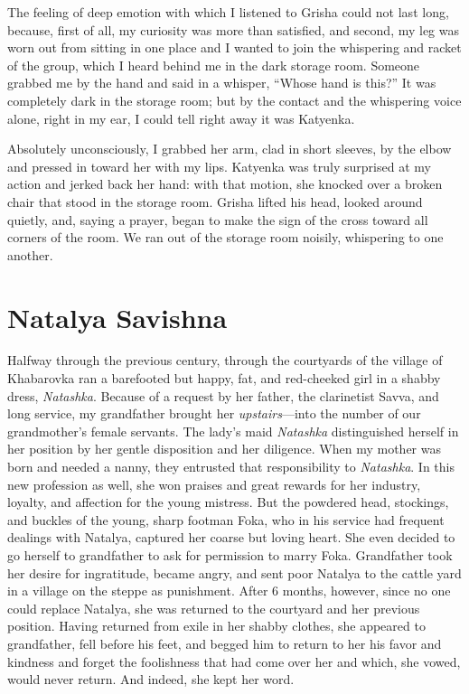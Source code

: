 The feeling of deep emotion with which I listened to Grisha could not last long, because, first of all, my curiosity was more than satisfied, and second, my leg was worn out from sitting in one place and I wanted to join the whispering and racket of the group, which I heard behind me in the dark storage room. Someone grabbed me by the hand and said in a whisper, ``Whose hand is this?'' It was completely dark in the storage room; but by the contact and the whispering voice alone, right in my ear, I could tell right away it was Katyenka.

Absolutely unconsciously, I grabbed her arm, clad in short sleeves, by the elbow and pressed in toward her with my lips. Katyenka was truly surprised at my action and jerked back her hand: with that motion, she knocked over a broken chair that stood in the storage room. Grisha lifted his head, looked around quietly, and, saying a prayer, began to make the sign of the cross toward all corners of the room. We ran out of the storage room noisily, whispering to one another.

\chapter{Natalya Savishna}

Halfway through the previous century, through the courtyards of the village of Khabarovka ran a barefooted but happy, fat, and red-cheeked girl in a shabby dress, \textit{Natashka}. Because of a request by her father, the clarinetist Savva, and long service, my grandfather brought her \emph{upstairs}---into the number of our grandmother's female servants. The lady's maid \textit{Natashka} distinguished herself in her position by her gentle disposition and her diligence. When my mother was born and needed a nanny, they entrusted that responsibility to \textit{Natashka}. In this new profession as well, she won praises and great rewards for her industry, loyalty, and affection for the young mistress. But the powdered head, stockings, and buckles of the young, sharp footman Foka, who in his service had frequent dealings with Natalya, captured her coarse but loving heart. She even decided to go herself to grandfather to ask for permission to marry Foka. Grandfather took her desire for ingratitude, became angry, and sent poor Natalya to the cattle yard in a village on the steppe as punishment. After 6 months, however, since no one could replace Natalya, she was returned to the courtyard and her previous position. Having returned from exile in her shabby clothes, she appeared to grandfather, fell before his feet, and begged him to return to her his favor and kindness and forget the foolishness that had come over her and which, she vowed, would never return. And indeed, she kept her word.

